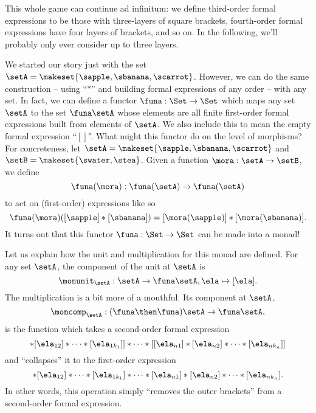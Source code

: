 This whole game can continue ad infinitum: we define third-order formal expressions to be those with three-layers of square brackets, fourth-order formal expressions have four layers of brackets, and so on.
In the following, we'll probably only ever consider up to three layers.

We started our story just with the set $\setA = \makeset{ \sapple, \sbanana, \scarrot }$.
However, we can do the same construction -- using ``$*$'' and building formal expressions of any order -- with any set.
In fact, we can define a functor $\funa: \Set \to \Set$ which maps any set $\setA$ to the set $\funa \setA$ whose elements are all finite first-order formal expressions built from elements of $\setA$.
We also include this to mean the empty formal expression ``$[ ]$''.
What might this functor do on the level of morphisms?
For concreteness, let $\setA = \makeset{ \sapple, \sbanana, \scarrot } $ and $\setB = \makeset{ \swater, \stea }$.
Given a function $\mora: \setA \to \setB$, we define
\begin{equation}
    \funa(\mora) : \funa(\setA) \to \funa(\setA)
\end{equation}
to act on (first-order) expressions like so
\begin{equation}
    \funa(\mora)([\sapple]*[\sbanana]) = [\mora(\sapple)]*[\mora(\sbanana)].
\end{equation}
It turns out that this functor $\funa: \Set \to \Set$ can be made into a monad!

Let us explain how the unit and multiplication for this monad are defined.
For any set $\setA$, the component of the unit at $\setA$ is
\begin{equation}
    \monunit_\setA : \setA \to \funa \setA, \ela \mapsto [\ela].
\end{equation}
The multiplication is a bit more of a mouthful.
Its component at $\setA$,
\begin{equation}
    \moncomp_\setA : (\funa \then \funa)\setA \to \funa \setA,
\end{equation}
is the function which takes a second-order formal expression
\begin{equation}
    [[\ela_{11}]* [\ela_{12}] * \cdots * [\ela_{1k_1}]] * \cdots * [[\ela_{n1}]* [\ela_{n2}] * \cdots * [\ela_{nk_n}]]
\end{equation}
and ``collapses'' it to the first-order expression
\begin{equation}
    [\ela_{11}]
    * [\ela_{12}] * \cdots * [\ela_{1k_1}] * \cdots * [\ela_{n1}]* [\ela_{n2}] * \cdots * [\ela_{nk_n}].
\end{equation}
In other words, this operation simply ``removes the outer brackets'' from a second-order formal expression.

